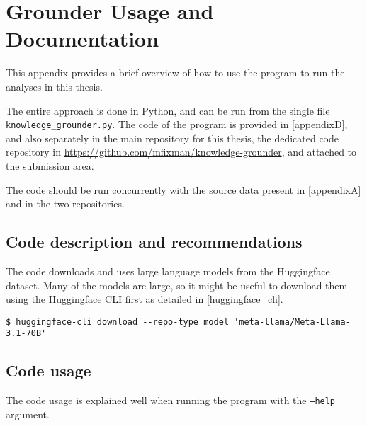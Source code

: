\section{Grounder Usage and Documentation}
\label{appendixC}


This appendix provides a brief overview of how to use the program to run the analyses in this thesis.

The entire approach is done in Python, and can be run from the single file \texttt{knowledge\_grounder.py}.
The code of the program is provided in \cref{appendixD}, and also separately in the main repository for this thesis, the dedicated code repository in \url{https://github.com/mfixman/knowledge-grounder}, and attached to the submission area.

The code should be run concurrently with the source data present in \cref{appendixA} and in the two repositories.

\subsection{Code description and recommendations}

The code downloads and uses large language models from the Huggingface dataset.
Many of the models are large, so it might be useful to download them using the Huggingface CLI first as detailed in \cref{huggingface_cli}.

\begin{lstlisting}[caption={How to pre-download large models from Huggingface. This is convenient, but not a necessity.},label={huggingface_cli}]
$ huggingface-cli download --repo-type model 'meta-llama/Meta-Llama-3.1-70B'
\end{lstlisting}

\subsection{Code usage}

The code usage is explained well when running the program with the \texttt{--help} argument.

